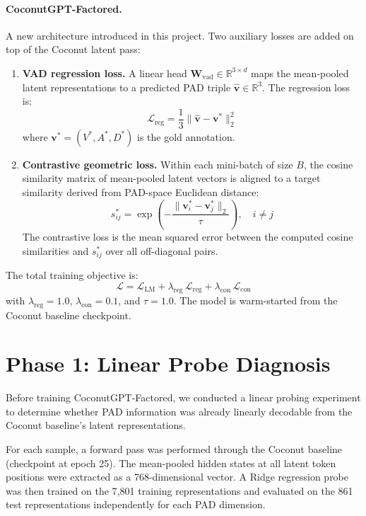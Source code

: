 \documentclass[12pt,twoside]{report}
\begin{document}
\paragraph{CoconutGPT-Factored.}
A new architecture introduced in this project.
Two auxiliary losses are added on top of the Coconut latent pass:
\begin{enumerate}
    \item \textbf{VAD regression loss.} A linear head $\mathbf{W}_{\text{vad}} \in \mathbb{R}^{3 \times d}$ maps the mean-pooled latent representations to a predicted PAD triple $\hat{\mathbf{v}} \in \mathbb{R}^3$.
    The regression loss is:
    \[
        \mathcal{L}_{\text{reg}} = \frac{1}{3} \|\hat{\mathbf{v}} - \mathbf{v}^*\|_2^2
    \]
    where $\mathbf{v}^* = (V^*, A^*, D^*)$ is the gold annotation.

    \item \textbf{Contrastive geometric loss.} Within each mini-batch of size $B$, the cosine similarity matrix of mean-pooled latent vectors is aligned to a target similarity derived from PAD-space Euclidean distance:
    \[
        s_{ij}^* = \exp\!\left(-\frac{\|\mathbf{v}_i^* - \mathbf{v}_j^*\|_2}{\tau}\right), \quad i \neq j
    \]
    The contrastive loss is the mean squared error between the computed cosine similarities and $s_{ij}^*$ over all off-diagonal pairs.
\end{enumerate}

The total training objective is:
\[
    \mathcal{L} = \mathcal{L}_{\text{LM}} + \lambda_{\text{reg}}\,\mathcal{L}_{\text{reg}} + \lambda_{\text{con}}\,\mathcal{L}_{\text{con}}
\]
with $\lambda_{\text{reg}} = 1.0$, $\lambda_{\text{con}} = 0.1$, and $\tau = 1.0$.
The model is warm-started from the Coconut baseline checkpoint.

\section{Phase 1: Linear Probe Diagnosis}

Before training CoconutGPT-Factored, we conducted a linear probing experiment to determine whether PAD information was already linearly decodable from the Coconut baseline's latent representations.

For each sample, a forward pass was performed through the Coconut baseline (checkpoint at epoch 25).
The mean-pooled hidden states at all latent token positions were extracted as a 768-dimensional vector.
A Ridge regression probe was then trained on the 7{,}801 training representations and evaluated on the 861 test representations independently for each PAD dimension.
\end{document}
